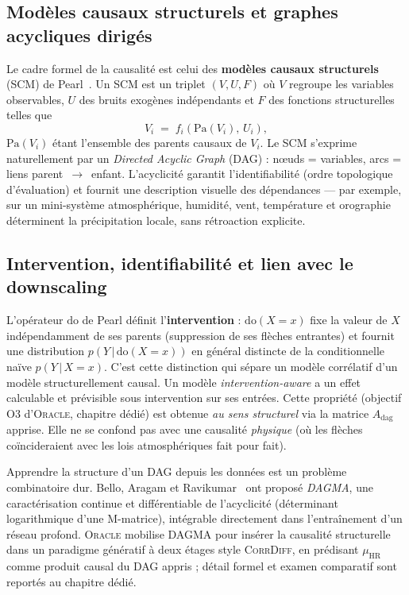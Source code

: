 \documentclass[14pt,a4paper,openany]{extreport}
\theoremstyle{definition}
\newcommand{\Oracle}{\textsc{Oracle}}
\newcommand{\CorrDiff}{\textsc{CorrDiff}}
\newcommand{\HR}{\ensuremath{\text{HR}}}
\newcommand{\muHR}{\ensuremath{\mu_{\HR}}}
\begin{document}
\subsection{Modèles causaux structurels et graphes acycliques dirigés}
\label{ssec:scm-dag}

Le cadre formel de la causalité est celui des \textbf{modèles causaux structurels} (SCM) de Pearl~\cite{pearl_causality_2009,pearl_book_of_why_2018}. Un SCM est un triplet $(V, U, F)$ où $V$ regroupe les variables observables, $U$ des bruits exogènes indépendants et $F$ des fonctions structurelles telles que
\begin{equation}
  V_i \;=\; f_i\!\left(\mathrm{Pa}(V_i),\, U_i\right),
  \label{eq:scm}
\end{equation}
$\mathrm{Pa}(V_i)$ étant l'ensemble des parents causaux de $V_i$. Le SCM s'exprime naturellement par un \emph{Directed Acyclic Graph} (DAG) : nœuds = variables, arcs = liens parent~$\to$~enfant. L'acyclicité garantit l'identifiabilité (ordre topologique d'évaluation) et fournit une description visuelle des dépendances --- par exemple, sur un mini-système atmosphérique, humidité, vent, température et orographie déterminent la précipitation locale, sans rétroaction explicite.
\label{fig:scm-dag}

\subsection{Intervention, identifiabilité et lien avec le downscaling}
\label{ssec:intervention}

L'opérateur $\mathrm{do}$ de Pearl définit l'\textbf{intervention} : $\mathrm{do}(X = x)$ fixe la valeur de $X$ indépendamment de ses parents (suppression de ses flèches entrantes) et fournit une distribution $p(Y\,|\,\mathrm{do}(X = x))$ en général distincte de la conditionnelle naïve $p(Y\,|\,X = x)$. C'est cette distinction qui sépare un modèle corrélatif d'un modèle structurellement causal. Un modèle \emph{intervention-aware} a un effet calculable et prévisible sous intervention sur ses entrées. Cette propriété (objectif O3 d'\Oracle{}, chapitre dédié) est obtenue \emph{au sens structurel} via la matrice $A_{\mathrm{dag}}$ apprise. Elle ne se confond pas avec une causalité \emph{physique} (où les flèches coïncideraient avec les lois atmosphériques fait pour fait).

\label{ssec:learned-dag}
Apprendre la structure d'un DAG depuis les données est un problème combinatoire dur. Bello, Aragam et Ravikumar~\cite{bello_dagma_2022} ont proposé \emph{DAGMA}, une caractérisation continue et différentiable de l'acyclicité (déterminant logarithmique d'une M-matrice), intégrable directement dans l'entraînement d'un réseau profond. \Oracle{} mobilise DAGMA pour insérer la causalité structurelle dans un paradigme génératif à deux étages style \CorrDiff{}, en prédisant $\muHR$ comme produit causal du DAG appris ; détail formel et examen comparatif sont reportés au chapitre dédié.
\end{document}
